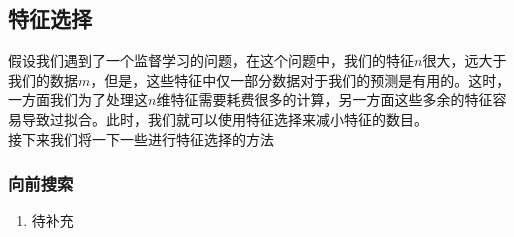 \subsection{特征选择}
假设我们遇到了一个监督学习的问题，在这个问题中，我们的特征$n$很大，远大于我们的数据$m$，但是，这些特征中仅一部分数据对于我们的预测是有用的。这时，一方面我们为了处理这$n$维特征需要耗费很多的计算，另一方面这些多余的特征容易导致过拟合。此时，我们就可以使用特征选择来减小特征的数目。  \\
接下来我们将一下一些进行特征选择的方法

\subsubsection{向前搜索}

\begin{enumerate}
	\item 待补充
\end{enumerate}










